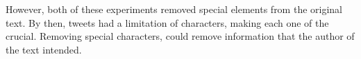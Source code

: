 However, both of these experiments removed special elements from the original text. By then, tweets had a limitation of characters, making each one of the crucial. Removing special
characters, could remove information that the author of the text intended. 


%
%
%
%
%
%

